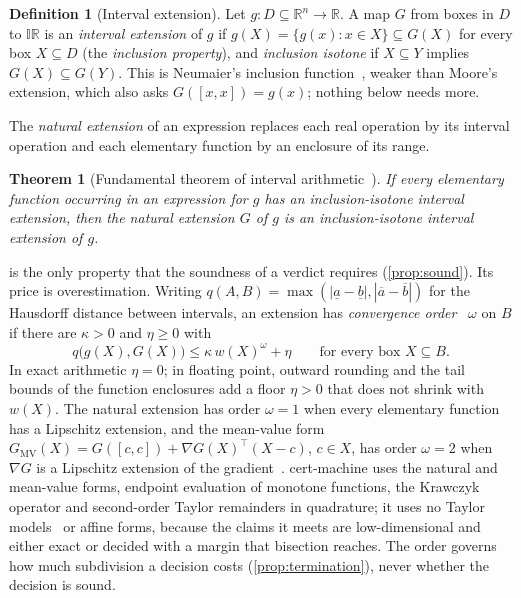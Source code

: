 \documentclass[preprint,11pt,a4paper]{elsarticle}
\newtheorem{theorem}{Theorem}
\theoremstyle{definition}
\newtheorem{definition}{Definition}
\newcommand{\R}{\mathbb{R}}
\newcommand{\IR}{\mathbb{IR}}
\begin{document}
\begin{definition}[Interval extension]\label{def:ext}
Let $g:D\subseteq\R^n\to\R$. A map $G$ from boxes in $D$ to $\IR$ is an \emph{interval extension} of $g$ if $g(X)=\{g(x):x\in X\}\subseteq G(X)$ for every box $X\subseteq D$ (the \emph{inclusion property}), and \emph{inclusion isotone} if $X\subseteq Y$ implies $G(X)\subseteq G(Y)$. This is Neumaier's inclusion function~\citep{Neumaier90}, weaker than Moore's extension, which also asks $G([x,x])=g(x)$; nothing below needs more.
\end{definition}

The \emph{natural extension} of an expression replaces each real operation by its interval operation and each elementary function by an enclosure of its range.

\begin{theorem}[Fundamental theorem of interval arithmetic~\citep{Moore09,Neumaier90}]\label{thm:ftia}
If every elementary function occurring in an expression for $g$ has an inclusion-isotone interval extension, then the natural extension $G$ of $g$ is an inclusion-isotone interval extension of $g$.
\end{theorem}

 is the only property that the soundness of a verdict requires (\cref{prop:sound}). Its price is overestimation. Writing $q(A,B)=\max(|\underline{a}-\underline{b}|,|\overline{a}-\overline{b}|)$ for the Hausdorff distance between intervals, an extension has \emph{convergence order}~\citep{Scholz12} $\omega$ on $B$ if there are $\kappa>0$ and $\eta\ge0$ with
\begin{equation}\label{eq:order}
q\bigl(g(X),G(X)\bigr)\le\kappa\,w(X)^{\omega}+\eta\qquad\text{for every box }X\subseteq B.
\end{equation}
In exact arithmetic $\eta=0$; in floating point, outward rounding and the tail bounds of the function enclosures add a floor $\eta>0$ that does not shrink with $w(X)$. The natural extension has order $\omega=1$ when every elementary function has a Lipschitz extension, and the mean-value form $G_{\mathrm{MV}}(X)=G([c,c])+\nabla G(X)^{\top}(X-c)$, $c\in X$, has order $\omega=2$ when $\nabla G$ is a Lipschitz extension of the gradient~\citep{Neumaier90}. cert-machine uses the natural and mean-value forms, endpoint evaluation of monotone functions, the Krawczyk operator and second-order Taylor remainders in quadrature; it uses no Taylor models~\citep{BerzMakino98} or affine forms, because the claims it meets are low-dimensional and either exact or decided with a margin that bisection reaches. The order governs how much subdivision a decision costs (\cref{prop:termination}), never whether the decision is sound.
\end{document}
